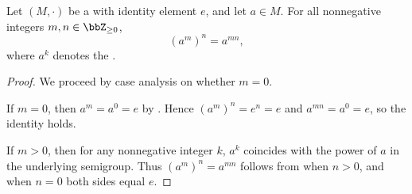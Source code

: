 \begin{lemma} \label{lemma:power_of_power_in_monoid_for_nonnegative_integers}
    Let $(M, \cdot)$ be a  with identity element $e$, and let $a \in M$. For all nonnegative integers $m, n \in \bbZ_{\geq 0}$,
    $$ (a^m)^n = a^{mn}, $$
    where $a^k$ denotes the .
\end{lemma}

\begin{proof}
    We proceed by case analysis on whether $m = 0$.

    If $m = 0$, then $a^m = a^0 = e$ by . Hence $(a^m)^n = e^n = e$ and $a^{mn} = a^0 = e$, so the identity holds.

    If $m > 0$, then for any nonnegative integer $k$, $a^k$ coincides with the power of $a$ in the underlying semigroup. Thus $(a^m)^n = a^{mn}$ follows from  when $n > 0$, and when $n = 0$ both sides equal $e$.
\end{proof}
